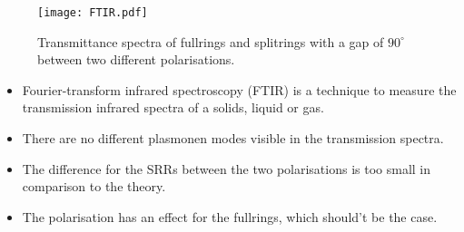 
  

  \begin{figure}
   \texttt{[image: FTIR.pdf]}
  \caption{Transmittance spectra of fullrings  and splitrings  with a gap of $90^{\circ}$ between two different polarisations. }
  \label{fig:ftir}
  \end{figure}
  
\begin{itemize}
 \item{Fourier-transform infrared spectroscopy (FTIR) is a technique to measure the transmission infrared spectra of a  solids, liquid or gas.} 
\item{There are no different plasmonen modes visible in the transmission spectra.}
\item{The difference for the SRRs between the two polarisations is too small in comparison to the theory. }
\item{The polarisation has an effect for the fullrings, which should't be the case. }
  \end{itemize}
